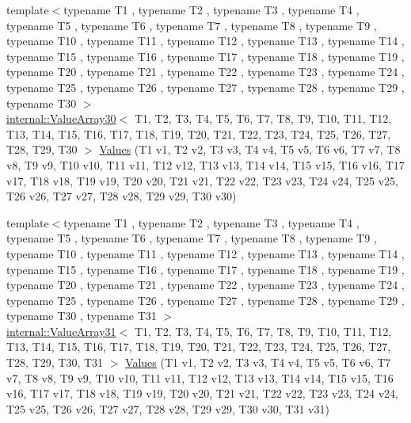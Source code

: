 \begin{DoxyCompactItemize}
\item 
{\footnotesize template$<$typename T1 , typename T2 , typename T3 , typename T4 , typename T5 , typename T6 , typename T7 , typename T8 , typename T9 , typename T10 , typename T11 , typename T12 , typename T13 , typename T14 , typename T15 , typename T16 , typename T17 , typename T18 , typename T19 , typename T20 , typename T21 , typename T22 , typename T23 , typename T24 , typename T25 , typename T26 , typename T27 , typename T28 , typename T29 , typename T30 $>$ }\\\mbox{\hyperlink{classtesting_1_1internal_1_1_value_array30}{internal\+::\+Value\+Array30}}$<$ T1, T2, T3, T4, T5, T6, T7, T8, T9, T10, T11, T12, T13, T14, T15, T16, T17, T18, T19, T20, T21, T22, T23, T24, T25, T26, T27, T28, T29, T30 $>$ \mbox{\hyperlink{namespacetesting_a016767be70ad0412bdbf837bc4d3ca98}{Values}} (T1 v1, T2 v2, T3 v3, T4 v4, T5 v5, T6 v6, T7 v7, T8 v8, T9 v9, T10 v10, T11 v11, T12 v12, T13 v13, T14 v14, T15 v15, T16 v16, T17 v17, T18 v18, T19 v19, T20 v20, T21 v21, T22 v22, T23 v23, T24 v24, T25 v25, T26 v26, T27 v27, T28 v28, T29 v29, T30 v30)
\item 
{\footnotesize template$<$typename T1 , typename T2 , typename T3 , typename T4 , typename T5 , typename T6 , typename T7 , typename T8 , typename T9 , typename T10 , typename T11 , typename T12 , typename T13 , typename T14 , typename T15 , typename T16 , typename T17 , typename T18 , typename T19 , typename T20 , typename T21 , typename T22 , typename T23 , typename T24 , typename T25 , typename T26 , typename T27 , typename T28 , typename T29 , typename T30 , typename T31 $>$ }\\\mbox{\hyperlink{classtesting_1_1internal_1_1_value_array31}{internal\+::\+Value\+Array31}}$<$ T1, T2, T3, T4, T5, T6, T7, T8, T9, T10, T11, T12, T13, T14, T15, T16, T17, T18, T19, T20, T21, T22, T23, T24, T25, T26, T27, T28, T29, T30, T31 $>$ \mbox{\hyperlink{namespacetesting_a40d9696e1754455c8329a866c17ed7bb}{Values}} (T1 v1, T2 v2, T3 v3, T4 v4, T5 v5, T6 v6, T7 v7, T8 v8, T9 v9, T10 v10, T11 v11, T12 v12, T13 v13, T14 v14, T15 v15, T16 v16, T17 v17, T18 v18, T19 v19, T20 v20, T21 v21, T22 v22, T23 v23, T24 v24, T25 v25, T26 v26, T27 v27, T28 v28, T29 v29, T30 v30, T31 v31)
\item 

\end{DoxyCompactItemize}
